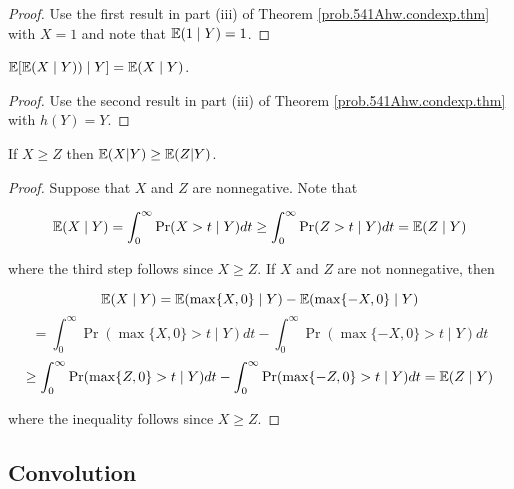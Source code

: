 \begin{proof}Use the first result in part (iii) of Theorem \ref{prob.541Ahw.condexp.thm} with \(X = 1\) and note that \(\mathbb{E}(1 \mid Y) = 1\).

\end{proof}

\begin{corollary}\label{prob.cor.cond.exp.cond.exp}

\end{corollary} \( \mathbb{E}[ \mathbb{E} (X \mid Y)) \mid Y]  = \mathbb{E}(X \mid Y)\).

\begin{proof}Use the second result in part (iii) of Theorem \ref{prob.541Ahw.condexp.thm} with \(h(Y) = Y\).

\end{proof}

\begin{lemma}\label{prob.cond.expec.pres.ineq} If $X\geq Z$ then $\mathbb{E}(X|Y)\geq \mathbb{E}(Z|Y)$. 
\end{lemma}

\begin{proof}Suppose that \(X\) and \(Z\) are nonnegative. Note that

\[
\mathbb{E}( X \mid Y) = \int_0^\infty \Pr(X > t \mid Y ) dt \geq  \int_0^\infty \Pr(Z > t \mid Y ) dt = \mathbb{E}(Z \mid Y)
\]

where the third step follows since \(X \geq Z\). If \(X\) and \(Z\) are not nonnegative, then 

\[
\mathbb{E}(X \mid Y) = \mathbb{E}(\max \{X, 0 \} \mid Y) - \mathbb{E}(\max \{-X, 0 \} \mid Y) 
\]
\[
= \int_0^\infty \Pr(\max \{X, 0 \} > t \mid Y ) dt -  \int_0^\infty \Pr(\max \{-X, 0 \} > t \mid Y ) dt 
\]
\[
\geq  \int_0^\infty \Pr(\max \{Z, 0 \} > t \mid Y ) dt -  \int_0^\infty \Pr(\max \{-Z, 0 \} > t \mid Y ) dt = \mathbb{E}(Z \mid Y)
\]

where the inequality follows since \(X \geq Z\).

\end{proof}



\subsection{Convolution}

